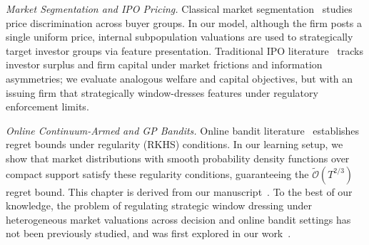 \textit{Market Segmentation and IPO Pricing.} Classical market segmentation~\cite{bergemann2015limits} studies price discrimination across buyer groups. In our model, although the firm posts a single uniform price, internal subpopulation valuations are used to strategically target investor groups via feature presentation. Traditional IPO literature~\cite{rock1986why,ritter2002review} tracks investor surplus and firm capital under market frictions and information asymmetries; we evaluate analogous welfare and capital objectives, but with an issuing firm that strategically window-dresses features under regulatory enforcement limits.

\textit{Online Continuum-Armed and GP Bandits.} Online bandit literature~\cite{bubeck2011xarmed,flaxman2005online,srinivas2010gp,russo2014learning,chowdhury2017kernelized,vakili2021information,rasmussen2006gaussian} establishes regret bounds under regularity (RKHS) conditions. In our learning setup, we show that market distributions with smooth probability density functions over compact support satisfy these regularity conditions, guaranteeing the $\widetilde{\mathcal{O}}(T^{2/3})$ regret bound. This chapter is derived from our manuscript~\cite{singh2026ipo_journal}. To the best of our knowledge, the problem of regulating strategic window dressing under heterogeneous market valuations across decision and online bandit settings has not been previously studied, and was first explored in our work~\cite{singh2026ipo_journal}.






